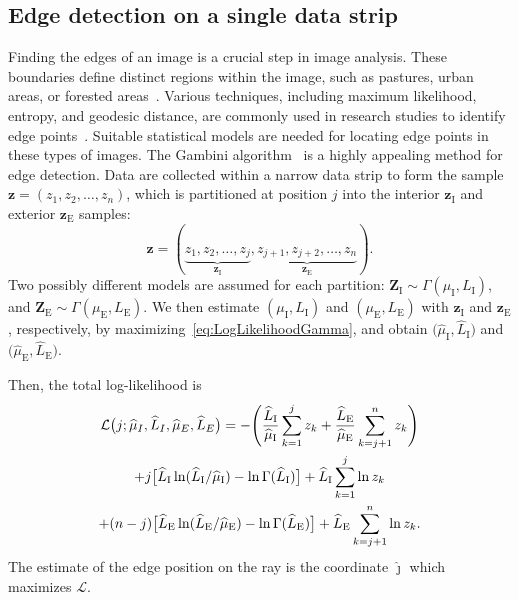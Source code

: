 \documentclass{article}
\begin{document}
\subsection{Edge detection on a single data strip}
Finding the edges of an image is a crucial step in image analysis. These boundaries define distinct regions within the image, such as pastures, urban areas, or forested areas~\cite{monferran2020modelo}. Various techniques, including maximum likelihood, entropy, and geodesic distance, are commonly used in research studies to identify edge points~\cite{NaranjoTorres2017,Nascimento2019}. 
Suitable statistical models are needed for locating edge points in these types of images.
The Gambini algorithm~\cite{Gambini2007} is a highly appealing method for edge detection. 
Data are collected within a narrow data strip to form the sample $\bm z = (z_1,z_2,\dots,z_n)$, which is partitioned at position $j$ into the interior $\bm z_\text{I}$ and exterior $\bm z_\text{E}$ samples:
$$
\bm z = (\underbrace{z_1,z_2,\dots,z_j}_{\bm z_\text{I}}, 
\underbrace{z_{j+1}, z_{j+2},\dots,z_n}_{\bm z_\text{E}}).
$$
Two possibly different models are assumed for each partition:
$\bm Z_\text{I} \sim \Gamma(\mu_\text{I},L_\text{I})$, and 
$\bm Z_\text{E} \sim \Gamma(\mu_\text{E},L_\text{E})$.
We then estimate $(\mu_\text{I},L_\text{I})$ and $(\mu_\text{E},L_\text{E})$ with $\bm z_\text{I}$ and $\bm z_\text{E}$, respectively, by maximizing~\eqref{eq:LogLikelihoodGamma}, and obtain $\big(\widehat{\mu}_\text{I}, \widehat{L}_\text{I}\big)$ and $\big(\widehat{\mu}_\text{E}, \widehat{L}_\text{E}\big)$.

Then, the total log-likelihood is
\begin{multline*}%
\mathcal L\big(j;\widehat{\mu}_I, \widehat{L}_I,\widehat{\mu}_E, \widehat{L}_E\big)= -\Bigg(
	\frac{\widehat{L}_\text{I}}{\widehat{\mu}_\text{I}}\sum_{k=1}^{j} z_k +
	\frac{\widehat{L}_\text{E}}{\widehat{\mu}_\text{E}}\sum_{k=j+1}^{n} z_k  
	\Bigg)\mbox{}\\
+j \big[\widehat{L}_\text{I}\ln (\widehat{L}_\text{I} / \widehat{\mu}_\text{I}) - \ln \Gamma(\widehat{L}_\text{I})\big]
+\widehat{L}_\text{I} \sum_{k=1}^{j}\ln z_k  \mbox{}\\
+(n-j) \big[\widehat{L}_\text{E}\ln (\widehat{L}_\text{E} / \widehat{\mu}_\text{E}) - \ln \Gamma(\widehat{L}_\text{E})\big]
+\widehat{L}_\text{E} \sum_{k=j+1}^{n}\ln z_k .%
\raisetag{2.2em}
\end{multline*}
The estimate of the edge position on the ray is the coordinate  $\widehat\jmath$ which maximizes $\mathcal L$.
\end{document}
